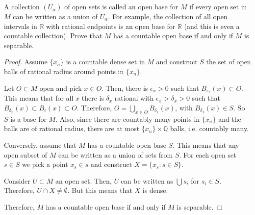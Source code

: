 \subsection{} A collection $(U_\alpha)$ of open sets is called an open base for $M$ if every open set in $M$ can be written as a union of $U_\alpha$. For example, the collection of all open intervals in $\mathbb{R}$ with rational endpoints is an open base for $\mathbb{R}$ (and this is even a countable collection). Prove that $M$ has a countable open base if and only if $M$ is separable.

\begin{proof}
Assume $\{x_n\}$ is a countable dense set in $M$ and construct $S$ the set of open balls of rational radius around points in $\{x_n\}$.

Let $O \subset M$ open and pick $x \in O$. Then, there is $\epsilon_x > 0$ such that $B_{\epsilon_x}(x) \subset O$. This means that for all $x$ there is $\delta_x$ rational with $\epsilon_x > \delta_x > 0$ such that $B_{\delta_x}(x) \subset B_\epsilon(x) \subset O$. Therefore, $O = \bigcup_{x \in O} B_{\delta_x}(x)$, with $B_{\delta_x}(x) \in S$. So $S$ is a base for $M$. Also, since there are countably many points in $\{x_n\}$ and the balls are of rational radius, there are at most $\{x_n\} \times \mathbb{Q}$ balls, i.e. countably many.

Conversely, assume that $M$ has a countable open base $S$. This means that any open subset of $M$ can be written as a union of sets from $S$.
For each open set $s \in S$ we pick a point $x_s \in s$ and construct $X = \{x_s : s \in S\}$.

Consider $U \subset M$ an open set. Then, $U$ can be written as $\bigcup s_i$ for $s_i \in S$. Therefore, $U \cap X \neq \emptyset$. But this means that $X$ is dense.

Therefore, $M$ has a countable open base if and only if $M$ is separable.


\end{proof}

